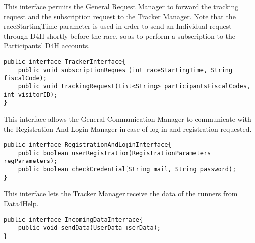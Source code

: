 This interface permits the General Request Manager to forward the tracking request and the subscription request to the Tracker Manager. Note that the raceStartingTime parameter is used in order to send an Individual request through D4H shortly before the race, so as to perform a subscription to the Participants' D4H accounts.
\begin{lstlisting}
public interface TrackerInterface{
	public void subscriptionRequest(int raceStartingTime, String fiscalCode);
	public void trackingRequest(List<String> participantsFiscalCodes, int visitorID);
}
\end{lstlisting}

This interface allows the General Communication Manager to communicate with the Registration And Login Manager in case of log in and registration requested.
\begin{lstlisting}
public interface RegistrationAndLoginInterface{
	public boolean userRegistration(RegistrationParameters regParameters);
	public boolean checkCredential(String mail, String password);
}
\end{lstlisting}

This interface lets the Tracker Manager receive the data of the runners from Data4Help.
\begin{lstlisting}
public interface IncomingDataInterface{
	public void sendData(UserData userData);
}
\end{lstlisting}